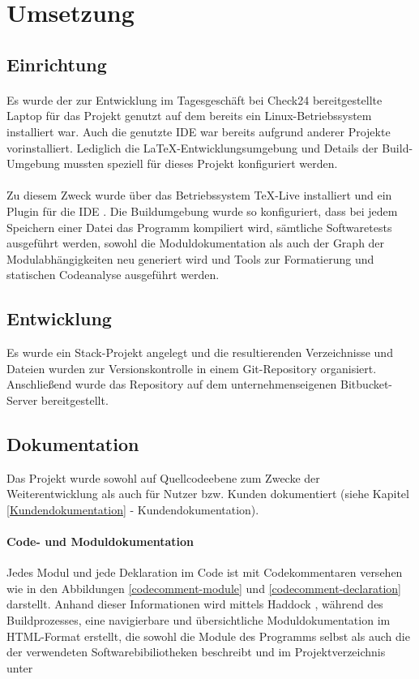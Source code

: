 \section{Umsetzung}

\subsection{Einrichtung}
\paragraph{}
Es wurde der zur Entwicklung im Tagesgeschäft bei Check24 bereitgestellte Laptop
für das Projekt genutzt auf dem bereits ein Linux-Betriebssystem installiert war.
Auch die genutzte \gls{IDE} war bereits aufgrund anderer Projekte vorinstalliert.
Lediglich die \LaTeX-Entwicklungsumgebung und Details der Build-Umgebung mussten
speziell für dieses Projekt konfiguriert werden.

\paragraph{}
Zu diesem Zweck wurde über das Betriebssystem \TeX-Live \cite{texlive} installiert
und ein Plugin für die \gls{IDE} \cite{latex-workshop}. Die Buildumgebung
wurde so konfiguriert, dass bei jedem Speichern einer Datei das Programm kompiliert wird,
sämtliche Softwaretests ausgeführt werden, sowohl die Moduldokumentation als auch
der Graph der Modulabhängigkeiten neu generiert wird und Tools zur Formatierung
und statischen Codeanalyse ausgeführt werden.

\subsection{Entwicklung}
Es wurde ein Stack\cite{stack}-Projekt angelegt und die resultierenden
Verzeichnisse und Dateien wurden zur Versionskontrolle in einem Git\cite{git}-Repository organisiert.
Anschließend wurde das Repository auf dem unternehmenseigenen Bitbucket-Server \cite{bitbucket}
bereitgestellt.

\subsection{Dokumentation}
Das Projekt wurde sowohl auf Quellcodeebene zum Zwecke der Weiterentwicklung als
auch für Nutzer bzw. Kunden dokumentiert (siehe Kapitel \ref{Kundendokumentation} - Kundendokumentation).

\paragraph{Code- und Moduldokumentation}
Jedes Modul und jede Deklaration im Code ist mit Codekommentaren versehen wie in
den Abbildungen \ref{codecomment-module} und \ref{codecomment-declaration} darstellt.
Anhand dieser Informationen wird mittels Haddock \cite{haddock}, während des Buildprozesses,
eine navigierbare und übersichtliche Moduldokumentation im HTML-Format erstellt,
die sowohl die Module des Programms selbst als auch die der verwendeten Softwarebibiliotheken
beschreibt und im Projektverzeichnis unter

